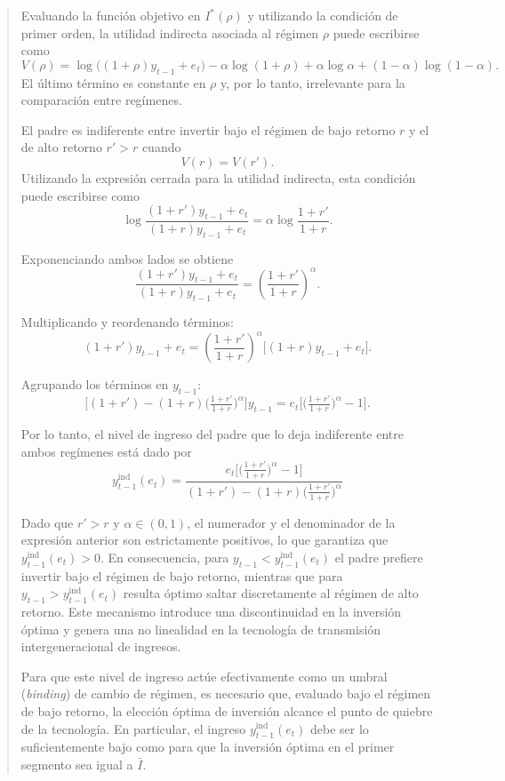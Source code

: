 \documentclass[12pt]{article}
\begin{document}
\begin{abstract}
Evaluando la función objetivo en $I^*(\rho)$ y utilizando la condición de primer orden, la utilidad indirecta asociada al régimen $\rho$ puede escribirse como
\[
V(\rho)
=
\log\big((1+\rho)y_{t-1}+e_t\big)
-
\alpha\log(1+\rho)
+
\alpha\log\alpha
+
(1-\alpha)\log(1-\alpha).
\]
El último término es constante en $\rho$ y, por lo tanto, irrelevante para la comparación entre regímenes.


El padre es indiferente entre invertir bajo el régimen de bajo retorno $r$ y el de alto retorno $r'>r$ cuando
\[
V(r)=V(r').
\]
Utilizando la expresión cerrada para la utilidad indirecta, esta condición puede escribirse como
\[
\log\frac{(1+r')y_{t-1}+e_t}{(1+r)y_{t-1}+e_t}
=
\alpha
\log\frac{1+r'}{1+r}.
\tag{IC}
\]

Exponenciando ambos lados se obtiene
\[
\frac{(1+r')y_{t-1}+e_t}{(1+r)y_{t-1}+e_t}
=
\left(\frac{1+r'}{1+r}\right)^{\alpha}.
\]

Multiplicando y reordenando términos:
\[
(1+r')y_{t-1}+e_t
=
\left(\frac{1+r'}{1+r}\right)^{\alpha}
\big[(1+r)y_{t-1}+e_t\big].
\]

Agrupando los términos en $y_{t-1}$:
\[
\Big[(1+r')-(1+r)\Big(\tfrac{1+r'}{1+r}\Big)^{\alpha}\Big]y_{t-1}
=
e_t\Big[\Big(\tfrac{1+r'}{1+r}\Big)^{\alpha}-1\Big].
\]

Por lo tanto, el nivel de ingreso del padre que lo deja indiferente entre ambos regímenes está dado por
\[
\boxed{
y_{t-1}^{\text{ind}}(e_t)
=
\frac{
e_t\Big[\big(\tfrac{1+r'}{1+r}\big)^{\alpha}-1\Big]
}{
(1+r')-(1+r)\big(\tfrac{1+r'}{1+r}\big)^{\alpha}
}
}
\]

Dado que $r'>r$ y $\alpha\in(0,1)$, el numerador y el denominador de la expresión anterior son estrictamente positivos, lo que garantiza que $y_{t-1}^{\text{ind}}(e_t)>0$. En consecuencia, para $y_{t-1}<y_{t-1}^{\text{ind}}(e_t)$ el padre prefiere invertir bajo el régimen de bajo retorno, mientras que para $y_{t-1}>y_{t-1}^{\text{ind}}(e_t)$ resulta óptimo saltar discretamente al régimen de alto retorno. Este mecanismo introduce una discontinuidad en la inversión óptima y genera una no linealidad en la tecnología de transmisión intergeneracional de ingresos.


Para que este nivel de ingreso actúe efectivamente como un umbral (\emph{binding}) de cambio de régimen, es necesario que, evaluado bajo el régimen de bajo retorno, la elección óptima de inversión alcance el punto de quiebre de la tecnología. En particular, el ingreso \(y_{t-1}^{\text{ind}}(e_t)\) debe ser lo suficientemente bajo como para que la inversión óptima en el primer segmento sea igual a \(\bar I\).


\end{abstract}
\end{document}
